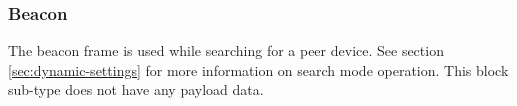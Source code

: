 \subsubsection{Beacon}

The beacon frame is used while searching for a peer device. See section \ref{sec:dynamic-settings} for more information
on search mode operation. This block sub-type does not have any payload data.
